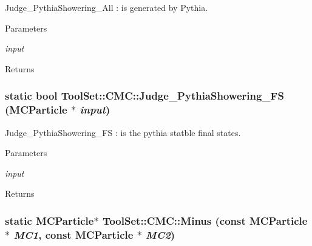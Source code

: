 Judge\_\-PythiaShowering\_\-All : is generated by Pythia. 
\begin{DoxyParams}{Parameters}
\item[{\em input}]\end{DoxyParams}
\begin{DoxyReturn}{Returns}

\end{DoxyReturn}
\hypertarget{classToolSet_1_1CMC_a47f5a5aff7196a77a729c703ffed1ce7}{
\subsubsection[{Judge\_\-PythiaShowering\_\-FS}]{\setlength{\rightskip}{0pt plus 5cm}static bool ToolSet::CMC::Judge\_\-PythiaShowering\_\-FS (MCParticle $\ast$ {\em input})}}
\label{classToolSet_1_1CMC_a47f5a5aff7196a77a729c703ffed1ce7}


Judge\_\-PythiaShowering\_\-FS : is the pythia statble final states. 
\begin{DoxyParams}{Parameters}
\item[{\em input}]\end{DoxyParams}
\begin{DoxyReturn}{Returns}

\end{DoxyReturn}
\hypertarget{classToolSet_1_1CMC_aa597db31bacbc37cbc16da5bfe2b1d9a}{
\subsubsection[{Minus}]{\setlength{\rightskip}{0pt plus 5cm}static MCParticle$\ast$ ToolSet::CMC::Minus (const MCParticle $\ast$ {\em MC1}, \/  const MCParticle $\ast$ {\em MC2})}}
\label{classToolSet_1_1CMC_aa597db31bacbc37cbc16da5bfe2b1d9a}


